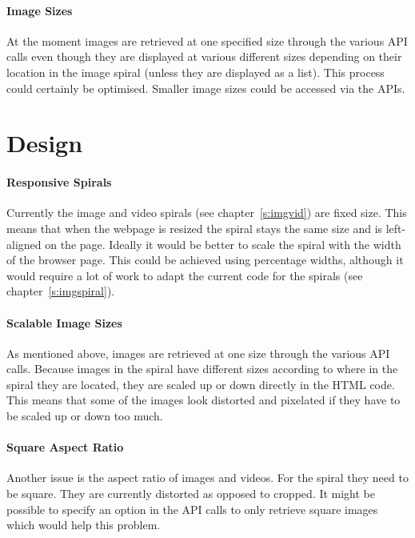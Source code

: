 \paragraph{Image Sizes} 
At the moment images are retrieved at one specified size through the various \ac{API} calls even though they are displayed at various different sizes depending on their location in the image spiral (unless they are displayed as a list). This process could certainly be optimised. Smaller image sizes could be accessed via the \ac{API}s.


\section{Design}

\paragraph{Responsive Spirals} 
Currently the image and video spirals (see chapter~\ref{s:imgvid}) are fixed size. This means that when the webpage is resized the spiral stays the same size and is left-aligned on the page. Ideally it would be better to scale the spiral with the width of the browser page. This could be achieved using percentage widths, although it would require a lot of work to adapt the current code for the spirals (see chapter~\ref{s:imgspiral}).

\paragraph{Scalable Image Sizes} 
As mentioned above, images are retrieved at one size through the various \ac{API} calls. Because images in the spiral have different sizes according to where in the spiral they are located, they are scaled up or down directly in the \ac{HTML} code. This means that some of the images look distorted and pixelated if they have to be scaled up or down too much.

\paragraph{Square Aspect Ratio} 
Another issue is the aspect ratio of images and videos. For the spiral they need to be square. They are currently distorted as opposed to cropped. It might be possible to specify an option in the \ac{API} calls to only retrieve square images which would help this problem.

